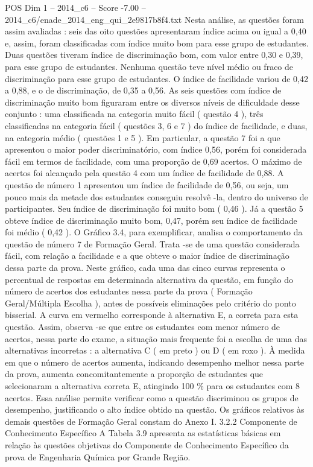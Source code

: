 \begin{textsample}{POS Dim 1 – 2014\_c6 – Score -7.00 – 2014\_c6/enade\_2014\_eng\_qui\_2e9817b8f4.txt}
Nesta análise, as questões foram assim avaliadas : seis das oito questões apresentaram índice acima ou igual a 0,40 e, assim, foram classificadas com índice muito bom para esse grupo de estudantes.
Duas questões tiveram índice de discriminação bom, com valor entre 0,30 e 0,39, para esse grupo de estudantes.
Nenhuma questão teve nível médio ou fraco de discriminação para esse grupo de estudantes.
O índice de facilidade variou de 0,42 a 0,88, e o de discriminação, de 0,35 a 0,56.
As seis questões com índice de discriminação muito bom figuraram entre os diversos níveis de dificuldade desse conjunto : uma classificada na categoria muito fácil ( questão 4 ), três classificadas na categoria fácil ( questões 3, 6 e 7 ) do índice de facilidade, e duas, na categoria médio ( questões 1 e 5 ).
Em particular, a questão 7 foi a que apresentou o maior poder discriminatório, com índice 0,56, porém foi considerada fácil em termos de facilidade, com uma proporção de 0,69 acertos.
O máximo de acertos foi alcançado pela questão 4 com um índice de facilidade de 0,88.
A questão de número 1 apresentou um índice de facilidade de 0,56, ou seja, um pouco mais da metade dos estudantes conseguiu resolvê -la, dentro do universo de participantes.
Seu índice de discriminação foi muito bom ( 0,46 ).
Já a questão 5 obteve índice de discriminação muito bom, 0,47, porém seu índice de facilidade foi médio ( 0,42 ).
O Gráfico 3.4, para exemplificar, analisa o comportamento da questão de número 7 de Formação Geral.
Trata -se de uma questão considerada fácil, com relação a facilidade e a que obteve o maior índice de discriminação dessa parte da prova.
Neste gráfico, cada uma das cinco curvas representa o percentual de respostas em determinada alternativa da questão, em função do número de acertos dos estudantes nessa parte da prova ( Formação Geral/Múltipla Escolha ), antes de possíveis eliminações pelo critério do ponto bisserial.
A curva em vermelho corresponde à alternativa E, a correta para esta questão.
Assim, observa -se que entre os estudantes com menor número de acertos, nessa parte do exame, a situação mais frequente foi a escolha de uma das alternativas incorretas : a alternativa C ( em preto ) ou D ( em roxo ).
À medida em que o número de acertos aumenta, indicando desempenho melhor nessa parte da prova, aumenta concomitantemente a proporção de estudantes que selecionaram a alternativa correta E, atingindo 100 \% para os estudantes com 8 acertos.
Essa análise permite verificar como a questão discriminou os grupos de desempenho, justificando o alto índice obtido na questão.
Os gráficos relativos às demais questões de Formação Geral constam do Anexo I. 3.2.2 Componente de Conhecimento Específico A Tabela 3.9 apresenta as estatísticas básicas em relação às questões objetivas do Componente de Conhecimento Específico da prova de Engenharia Química por Grande Região.

\end{textsample}
